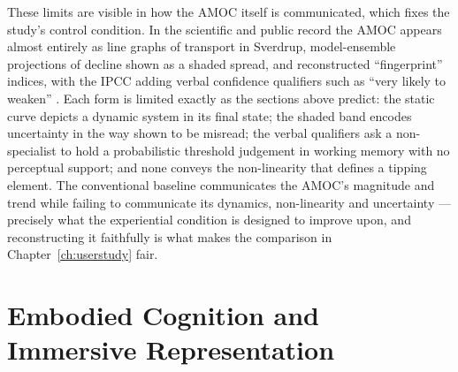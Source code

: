 These limits are visible in how the AMOC itself is communicated, which fixes the study's control condition. In the scientific and public record the AMOC appears almost entirely as line graphs of transport in Sverdrup, model-ensemble projections of decline shown as a shaded spread, and reconstructed ``fingerprint'' indices, with the IPCC adding verbal confidence qualifiers such as ``very likely to weaken'' \citep{caesar2018, ipcc2021}. Each form is limited exactly as the sections above predict: the static curve depicts a dynamic system in its final state; the shaded band encodes uncertainty in the way shown to be misread; the verbal qualifiers ask a non-specialist to hold a probabilistic threshold judgement in working memory with no perceptual support; and none conveys the non-linearity that defines a tipping element. The conventional baseline communicates the AMOC's magnitude and trend while failing to communicate its dynamics, non-linearity and uncertainty --- precisely what the experiential condition is designed to improve upon, and reconstructing it faithfully is what makes the comparison in Chapter~\ref{ch:userstudy} fair.

\section{Embodied Cognition and Immersive Representation}
\label{sec:embodied-viz}

